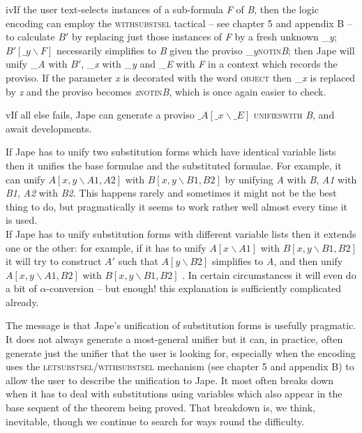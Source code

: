 \documentclass[11pt]{book}
\newcommand{\tab}{\hspace{5mm}}
\begin{document}
iv\tab If the user text-selects instances of a sub-formula \textit{F} of \textit{B}, then the logic encoding can employ the \textsc{withsubstsel} tactical -- see chapter 5 and appendix B -- to calculate $B' $ by replacing just those instances of \textit{F} by a fresh unknown \_\textit{y}; $B' [\_{}y\backslash F]$ necessarily simplifies to \textit{B} given the proviso \_\textit{y}{\nobreakspace}\textsc{notin}{\nobreakspace}\textit{B}; then Jape will unify \_\textit{A} with $B' $, \_\textit{x} with \_\textit{y} and \_\textit{E} with \textit{F} in a context which records the proviso. If the parameter \textit{x} is decorated with the word \textsc{object} then \_\textit{x} is replaced by \textit{z} and the proviso becomes \textit{z}{\nobreakspace}\textsc{notin}{\nobreakspace}\textit{B}, which is once again easier to check.


v\tab If all else fails, Jape can generate a proviso $\_{}A[\_{}x\backslash \_{}E]$ \textsc{unifieswith} \textit{B}, and await developments.


If Jape has to unify two substitution forms which have identical variable lists then it unifies the base formulae and the substituted formulae. For example, it can unify $A[x,y\backslash A1,A2]$ with $B[x,y\backslash B1,B2]$ by unifying \textit{A} with \textit{B}, \textit{A1} with \textit{B1}, \textit{A2} with \textit{B2}. This happens rarely and sometimes it might not be the best thing to do, but pragmatically it seems to work rather well almost every time it is used.\\
If Jape has to unify substitution forms with different variable lists then it extends one or the other: for example, if it has to unify $A[x\backslash A1]$ with $B[x,y\backslash B1,B2]$ it will try to construct $A' $ such that $A[y\backslash B2]$ simplifies to \textit{A}, and then unify $A[x,y\backslash A1,B2]$ with $B[x,y\backslash B1,B2]$ . In certain circumstances it will even do a bit of \ensuremath{\alpha}-conversion -- but enough! this explanation is sufficiently complicated already.


The message is that Jape's unification of substitution forms is usefully pragmatic. It does not always generate a most-general unifier but it can, in practice, often generate just the unifier that the user is looking for, especially when the encoding uses the \textsc{letsubstsel/withsubstsel} mechanism (see chapter 5 and appendix B) to allow the user to describe the unification to Jape. It most often breaks down when it has to deal with substitutions using variables which also appear in the base sequent of the theorem being proved. That breakdown is, we think, inevitable, though we continue to search for ways round the difficulty.
\end{document}
